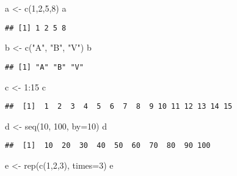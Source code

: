 \documentclass[
]{book}
\newenvironment{Shaded}{\begin{snugshade}}{\end{snugshade}}
\newcommand{\AttributeTok}[1]{\textcolor[rgb]{0.77,0.63,0.00}{#1}}
\newcommand{\DecValTok}[1]{\textcolor[rgb]{0.00,0.00,0.81}{#1}}
\newcommand{\FunctionTok}[1]{\textcolor[rgb]{0.00,0.00,0.00}{#1}}
\newcommand{\NormalTok}[1]{#1}
\newcommand{\OtherTok}[1]{\textcolor[rgb]{0.56,0.35,0.01}{#1}}
\newcommand{\SpecialCharTok}[1]{\textcolor[rgb]{0.00,0.00,0.00}{#1}}
\newcommand{\StringTok}[1]{\textcolor[rgb]{0.31,0.60,0.02}{#1}}
\begin{document}
\begin{Shaded}
\begin{Highlighting}[]
\NormalTok{a }\OtherTok{\textless{}{-}} \FunctionTok{c}\NormalTok{(}\DecValTok{1}\NormalTok{,}\DecValTok{2}\NormalTok{,}\DecValTok{5}\NormalTok{,}\DecValTok{8}\NormalTok{)}
\NormalTok{a}
\end{Highlighting}
\end{Shaded}

\begin{verbatim}
## [1] 1 2 5 8
\end{verbatim}

\begin{Shaded}
\begin{Highlighting}[]
\NormalTok{b }\OtherTok{\textless{}{-}} \FunctionTok{c}\NormalTok{(}\StringTok{"A"}\NormalTok{, }\StringTok{"B"}\NormalTok{, }\StringTok{"V"}\NormalTok{)}
\NormalTok{b}
\end{Highlighting}
\end{Shaded}

\begin{verbatim}
## [1] "A" "B" "V"
\end{verbatim}

\begin{Shaded}
\begin{Highlighting}[]
\NormalTok{c }\OtherTok{\textless{}{-}} \DecValTok{1}\SpecialCharTok{:}\DecValTok{15}
\NormalTok{c}
\end{Highlighting}
\end{Shaded}

\begin{verbatim}
##  [1]  1  2  3  4  5  6  7  8  9 10 11 12 13 14 15
\end{verbatim}

\begin{Shaded}
\begin{Highlighting}[]
\NormalTok{d }\OtherTok{\textless{}{-}} \FunctionTok{seq}\NormalTok{(}\DecValTok{10}\NormalTok{, }\DecValTok{100}\NormalTok{, }\AttributeTok{by=}\DecValTok{10}\NormalTok{)}
\NormalTok{d}
\end{Highlighting}
\end{Shaded}

\begin{verbatim}
##  [1]  10  20  30  40  50  60  70  80  90 100
\end{verbatim}

\begin{Shaded}
\begin{Highlighting}[]
\NormalTok{e }\OtherTok{\textless{}{-}} \FunctionTok{rep}\NormalTok{(}\FunctionTok{c}\NormalTok{(}\DecValTok{1}\NormalTok{,}\DecValTok{2}\NormalTok{,}\DecValTok{3}\NormalTok{), }\AttributeTok{times=}\DecValTok{3}\NormalTok{)}
\NormalTok{e}
\end{Highlighting}
\end{Shaded}
\end{document}
